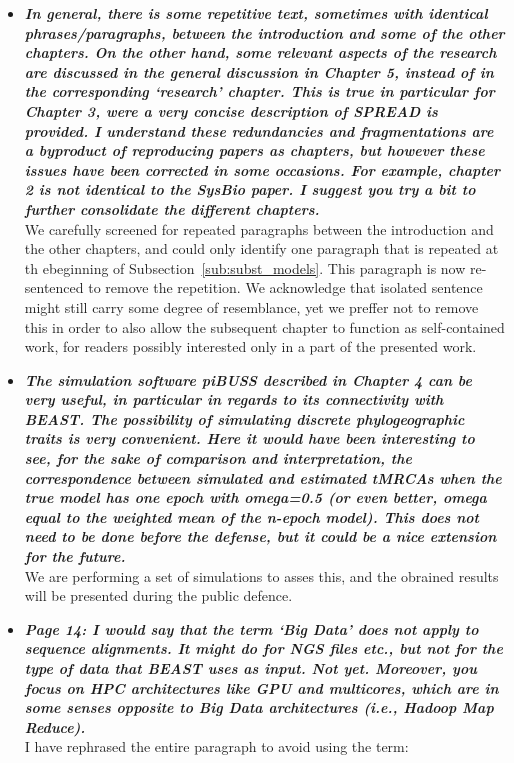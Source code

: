 \documentclass[english]{article}
\begin{document}
\begin{itemize}
\item {
{\it
\textbf{
In general, there is some repetitive text, sometimes with identical phrases/paragraphs, between the introduction and some of the other chapters. 
On the other hand, some relevant aspects of the research are discussed in the general discussion in Chapter 5, instead of in the corresponding `research' chapter. 
This is true in particular for Chapter 3, were a very concise description of SPREAD is provided. 
I understand these redundancies and fragmentations are a byproduct of reproducing papers as chapters, but however these issues have been corrected in some occasions. 
For example, chapter 2 is not identical to the SysBio paper. 
I suggest you try a bit to further consolidate the different chapters.
}%
}%
}%
\\
We carefully screened for repeated paragraphs between the introduction and the other chapters, and could only identify one paragraph that is repeated at th ebeginning of Subsection~\ref{sub:subst_models}.
This paragraph is now re-sentenced to remove the repetition.
We acknowledge that isolated sentence might still carry some degree of resemblance, yet we preffer not to remove this in order to also allow the subsequent chapter to function as self-contained work, for readers possibly interested only in a part of the presented work.


\item {
{\it
\textbf{
The simulation software piBUSS described in Chapter 4 can be very useful, in particular in regards to its connectivity with BEAST. 
The possibility of simulating discrete phylogeographic traits is very convenient. 
Here it would have been interesting to see, for the sake of comparison and interpretation, the correspondence between simulated and estimated tMRCAs when the true model has one epoch with omega=0.5 (or even better, omega equal to the weighted mean of the n-epoch model). 
This does not need to be done before the defense, but it could be a nice extension for the future.
}%
}%
}%
\\
We are performing a set of simulations to asses this, and the obrained results will be presented during the public defence.


\item {
{\it
\textbf{
Page 14: I would say that the term `Big Data' does not apply to sequence alignments. 
It might do for NGS files etc., but not for the type of data that BEAST uses as input. 
Not yet. 
Moreover, you focus on HPC architectures like GPU and multicores, which are in some senses opposite to Big Data architectures (i.e., Hadoop Map Reduce).
}%
}%
}%
\\
I have rephrased the entire paragraph to avoid using the term:


\end{itemize}
\end{document}
